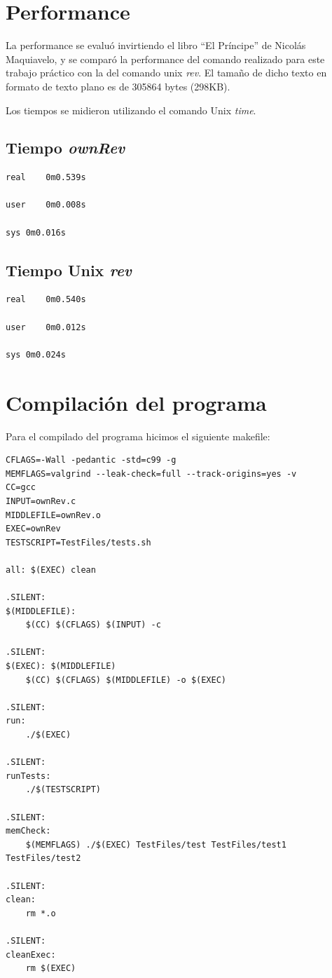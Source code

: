 \documentclass{article}
\begin{document}
\section{Performance}

La performance se evaluó invirtiendo el libro ``El Príncipe'' de Nicolás Maquiavelo, y se comparó
la performance del comando realizado para este trabajo práctico con la del comando unix \emph{rev}.
El tamaño de dicho texto en formato de texto plano es de 305864 bytes (298KB).

Los tiempos se midieron utilizando el comando Unix \emph{time}.

\subsection{Tiempo \emph{ownRev}}

\begin{verbatim}
real	0m0.539s

user	0m0.008s

sys	0m0.016s
\end{verbatim}



\subsection{Tiempo Unix \emph{rev}}

\begin{verbatim}
real	0m0.540s

user	0m0.012s

sys	0m0.024s
\end{verbatim}

\section{Compilación del programa}

Para el compilado del programa hicimos el siguiente makefile:

\begin{verbatim}
CFLAGS=-Wall -pedantic -std=c99 -g
MEMFLAGS=valgrind --leak-check=full --track-origins=yes -v
CC=gcc
INPUT=ownRev.c
MIDDLEFILE=ownRev.o
EXEC=ownRev
TESTSCRIPT=TestFiles/tests.sh

all: $(EXEC) clean

.SILENT:
$(MIDDLEFILE):
	$(CC) $(CFLAGS) $(INPUT) -c

.SILENT:
$(EXEC): $(MIDDLEFILE)
	$(CC) $(CFLAGS) $(MIDDLEFILE) -o $(EXEC)

.SILENT:	
run:
	./$(EXEC)

.SILENT:
runTests:
	./$(TESTSCRIPT)

.SILENT:
memCheck:
	$(MEMFLAGS) ./$(EXEC) TestFiles/test TestFiles/test1 TestFiles/test2

.SILENT:
clean:
	rm *.o

.SILENT:
cleanExec:
	rm $(EXEC)

\end{verbatim}
\end{document}
